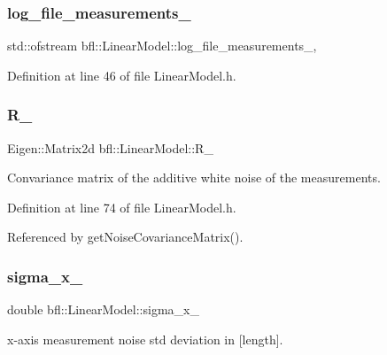 \subsubsection{\texorpdfstring{log\+\_\+file\+\_\+measurements\+\_\+}{log\_file\_measurements\_}}
{\footnotesize\ttfamily std\+::ofstream bfl\+::\+Linear\+Model\+::log\+\_\+file\+\_\+measurements\+\_\+\hspace{0.3cm}{\ttfamily [mutable]}, {\ttfamily [private]}}



Definition at line 46 of file Linear\+Model.\+h.

\mbox{\label{classbfl_1_1LinearModel_afafae44b71487e16b19311f773a19db8}} 
\subsubsection{\texorpdfstring{R\+\_\+}{R\_}}
{\footnotesize\ttfamily Eigen\+::\+Matrix2d bfl\+::\+Linear\+Model\+::\+R\+\_\+\hspace{0.3cm}{\ttfamily [protected]}}



Convariance matrix of the additive white noise of the measurements. 



Definition at line 74 of file Linear\+Model.\+h.



Referenced by get\+Noise\+Covariance\+Matrix().

\mbox{\label{classbfl_1_1LinearModel_af6f8cd224c5e6e434dbba28032e8ecdd}} 
\subsubsection{\texorpdfstring{sigma\+\_\+x\+\_\+}{sigma\_x\_}}
{\footnotesize\ttfamily double bfl\+::\+Linear\+Model\+::sigma\+\_\+x\+\_\+\hspace{0.3cm}{\ttfamily [protected]}}



x-\/axis measurement noise std deviation in \mbox{[}length\mbox{]}. 



